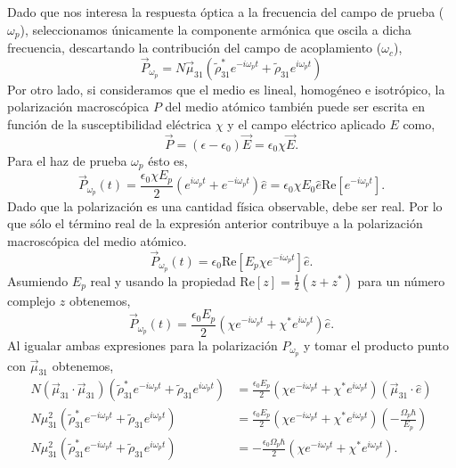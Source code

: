 Dado que nos interesa la respuesta óptica a la frecuencia del campo de prueba ($\omega_p$), seleccionamos únicamente la componente armónica que oscila a dicha frecuencia, descartando la contribución del campo de acoplamiento ($\omega_c$),
\begin{equation}
    \boxed{
    \vec{P}_{\omega_p} = N \vec{\mu}_{31} (\tilde{\rho}_{31}^* e^{-i \omega_p t} + \tilde{\rho}_{31} e^{i \omega_p t})
    }
\end{equation}
Por otro lado, si consideramos que el medio es lineal, homogéneo e isotrópico, la polarización macroscópica $P$ del medio atómico también puede ser escrita en función de la susceptibilidad eléctrica $\chi$ y el campo eléctrico aplicado $E$ como,
\begin{equation}
    \vec{P} = (\epsilon- \epsilon_0) \vec{E} = \epsilon_0 \chi \vec{E}.
\end{equation}
Para el haz de prueba $\omega_p$ ésto es,
\begin{equation}
    \vec{P}_{\omega_p}(t) = \frac{\epsilon_0 \chi E_p }{2}(e^{i \omega_p t} + e^{-i \omega_p t})\hat{e} = \epsilon_0 \chi E_0 \hat{e} \text{Re}[e^{-i \omega_p t}].
\end{equation}
Dado que la polarización es una cantidad física observable, debe ser real. Por lo que sólo el término real de la expresión anterior contribuye a la polarización macroscópica del medio atómico. 
\begin{equation}
    \vec{P}_{\omega_p}(t) = \epsilon_0 \text{Re}[E_p \chi e^{-i \omega_p t}] \hat{e}.
\end{equation}
Asumiendo $E_p$ real y usando la propiedad $\text{Re}[z] = \frac{1}{2}(z + z^*)$ para un número complejo $z$ obtenemos,
\begin{equation}
\boxed{
    \vec{P}_{\omega_p}(t) = \frac{\epsilon_0 E_p}{2} (\chi e^{-i \omega_p t} + \chi^* e^{i \omega_p t}) \hat{e}.
}
\end{equation}
Al igualar ambas expresiones para la polarización $P_{\omega_p}$ y tomar el producto punto con $\vec{\mu}_{31}$ obtenemos,
\begin{equation}
\begin{split}
    N (\vec{\mu}_{31} \cdot \vec{\mu}_{31}) (\tilde{\rho}_{31}^* e^{-i \omega_p t}  + \tilde{\rho}_{31} e^{i \omega_p t}) &= \frac{\epsilon_0 E_p}{2} (\chi e^{-i \omega_p t} + \chi^* e^{i \omega_p t}) (\vec{\mu}_{31} \cdot \hat{e})\\
    N \mu_{31}^2 (\tilde{\rho}_{31}^* e^{-i \omega_p t}  + \tilde{\rho}_{31} e^{i \omega_p t}) &= \frac{\epsilon_0 E_p}{2} (\chi e^{-i \omega_p t} + \chi^* e^{i \omega_p t}) (-\frac{\Omega_p \hbar}{E_p})\\
    N \mu_{31}^2 (\tilde{\rho}_{31}^* e^{-i \omega_p t}  + \tilde{\rho}_{31} e^{i \omega_p t}) &= -\frac{\epsilon_0 \Omega_p \hbar}{2} (\chi e^{-i \omega_p t} + \chi^* e^{i \omega_p t}).
\end{split}
\end{equation}
